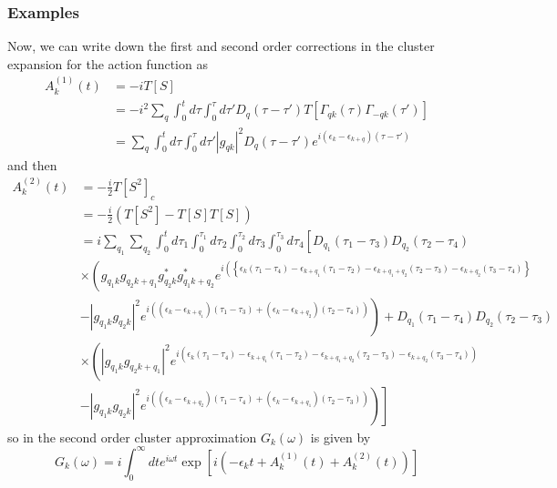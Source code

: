 \subsubsection{Examples}
Now, we can write down the first and second order corrections in the cluster expansion for the action function as
\begin{align}
    A_k^{(1)}(t) &= -i T[S] \\
&= -i^2 \sum_q \int_0^t d \tau \int_0^\tau d \tau' D_q(\tau - \tau') T\left[ \Gamma_{q k}(\tau) \Gamma_{-q k}(\tau') \right] \\
&= \sum_q \int_0^t d \tau \int_0^\tau d \tau' \left| g_{q k} \right|^2 D_q(\tau - \tau') e^{i (\epsilon_k - \epsilon_{k + q})(\tau - \tau')}
\end{align}
and then
\begin{align}
A_k^{(2)}(t) &= -\frac{i}{2}  T\left[S^2\right]_c\\
&= -\frac{i}{2} \left( T\left[S^2\right] - T\left[S\right] T\left[S\right] \right) \\
 &= i \sum_{q_1} \sum_{q_2} \int_0^t d \tau_1 \int_0^{\tau_1} d \tau_2 \int_0^{\tau_2} d \tau_3 \int_0^{\tau_3} d \tau_4 \left[ D_{q_1}(\tau_1 - \tau_3) D_{q_2}(\tau_2 - \tau_4) \right. \\
&\times \left( g_{q_1 k} g_{q_2 k + q_1} g_{q_2 k}^* g_{q_1 k + q_2}^* e^{i \left( \left\{ \epsilon_k (\tau_1 - \tau_4) - \epsilon_{k + q_1} (\tau_1 - \tau_2) - \epsilon_{k + q_1 + q_2} (\tau_2 - \tau_3) - \epsilon_{k + q_2} (\tau_3 - \tau_4) \right\} \right.} \right. \\
&\left. - |g_{q_1 k} g_{q_2 k}|^2 e^{i \left( (\epsilon_k - \epsilon_{k + q_1})(\tau_1 - \tau_3) + (\epsilon_k - \epsilon_{k + q_2})(\tau_2 - \tau_4) \right)} \right) + D_{q_1}(\tau_1 - \tau_4) D_{q_2}(\tau_2 - \tau_3) \\
&\times \left( |g_{q_1 k} g_{q_2 k + q_1}|^2 e^{i \left( \epsilon_k (\tau_1 - \tau_4) - \epsilon_{k + q_1} (\tau_1 - \tau_2) - \epsilon_{k + q_1 + q_2} (\tau_2 - \tau_3) - \epsilon_{k + q_2} (\tau_3 - \tau_4) \right)} \right. \\
&\left. \left. - |g_{q_1 k} g_{q_2 k}|^2 e^{i \left( (\epsilon_k - \epsilon_{k  + q_2})(\tau_1 - \tau_4) + (\epsilon_k - \epsilon_{k + q_1})(\tau_2 - \tau_3) \right)} \right) \right]
\end{align}
so in the second order cluster approximation $G_k(\omega)$ is given by
\begin{equation}
G_k(\omega )=i \int_0^{\infty} d t e^{i \omega t} \exp \left[ i \left( -\epsilon_k t + A_k^{(1)}(t) + A_k^{(2)}(t) \right) \right]
\end{equation}

